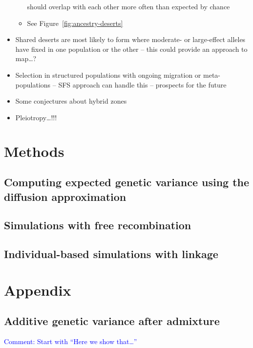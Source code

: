 \documentclass{article}
\newcommand{\aprcomment}[1]{{\textcolor{blue}{Comment: #1}}}
\begin{document}
\begin{itemize}
\begin{itemize}
                should overlap with each other more often than expected by chance
            \item See Figure~\ref{fig:ancestry-deserts}
        \end{itemize}
    \item Shared deserts are most likely to form where moderate- or large-effect
        alleles have fixed in one population or the other -- this could provide
        an approach to map\dots?
    \item Selection in structured populations with ongoing migration or
        meta-populations -- SFS approach can handle this -- prospects for the
        future
    \item Some conjectures about hybrid zones
    \item Pleiotropy\dots!!!
\end{itemize}

\section*{Methods}

\subsection*{Computing expected genetic variance using the diffusion approximation}

\subsection*{Simulations with free recombination}

\subsection*{Individual-based simulations with linkage}




\section{Appendix}

\subsection{Additive genetic variance after admixture}

\aprcomment{Start with ``Here we show that\dots''}
\end{document}
